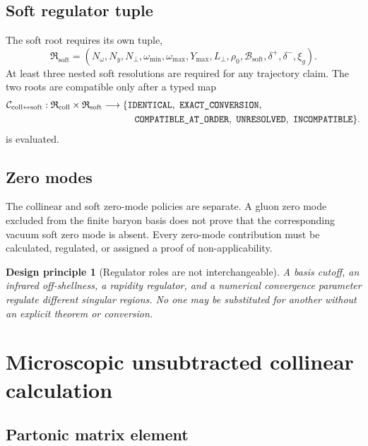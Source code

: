 \documentclass[11pt]{article}
\newtheorem{principle}[definition]{Design principle}
\newcommand{\cB}{\mathcal B}
\newcommand{\cC}{\mathcal C}
\newcommand{\Coll}{\ensuremath{\mathrm{coll}}}
\newcommand{\Soft}{\ensuremath{\mathrm{soft}}}
\begin{document}
\subsection{Soft regulator tuple}

The soft root requires its own tuple,
\begin{equation}
 \mathfrak R_{\Soft}
 =
 \left(
 N_{\omega},N_y,N_{\perp},
 \omega_{\min},\omega_{\max},
 Y_{\max},L_{\perp},
 \rho_{0},
 \cB_{\Soft},
 \delta^+,\delta^-,
 \xi_g
 \right).
 \label{eq:soft-regulator}
\end{equation}
At least three nested soft resolutions are required for any trajectory claim.  The two roots are compatible only after a typed map
\begin{equation}
 \begin{aligned}
 \cC_{\Coll\leftrightarrow\Soft}:
 \mathfrak R_{\Coll}\times\mathfrak R_{\Soft}
 &\longrightarrow
 \{\texttt{IDENTICAL},\ \texttt{EXACT\_CONVERSION},\\
 &\hspace{1.2cm}\texttt{COMPATIBLE\_AT\_ORDER},\
 \texttt{UNRESOLVED},\
 \texttt{INCOMPATIBLE}\}.
 \end{aligned}
 \label{eq:compat-map}
\end{equation}
is evaluated.

\subsection{Zero modes}

The collinear and soft zero-mode policies are separate.  A gluon zero mode excluded from the finite baryon basis does not prove that the corresponding vacuum soft zero mode is absent.  Every zero-mode contribution must be calculated, regulated, or assigned a proof of non-applicability.

\begin{principle}[Regulator roles are not interchangeable]
A basis cutoff, an infrared off-shellness, a rapidity regulator, and a numerical convergence parameter regulate different singular regions.  No one may be substituted for another without an explicit theorem or conversion.
\end{principle}

\section{Microscopic unsubtracted collinear calculation}
\label{sec:collinear}

\subsection{Partonic matrix element}
\end{document}
